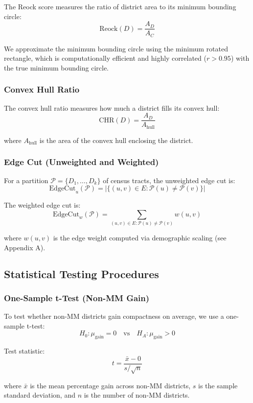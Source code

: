 The Reock score measures the ratio of district area to its minimum bounding circle:
\[
\text{Reock}(D) = \frac{A_D}{A_C}
\]

We approximate the minimum bounding circle using the minimum rotated rectangle, which is computationally efficient and highly correlated ($r > 0.95$) with the true minimum bounding circle.

\subsubsection{Convex Hull Ratio}

The convex hull ratio measures how much a district fills its convex hull:
\[
\text{CHR}(D) = \frac{A_D}{A_{\text{hull}}}
\]

where $A_{\text{hull}}$ is the area of the convex hull enclosing the district.

\subsubsection{Edge Cut (Unweighted and Weighted)}

For a partition $\mathcal{P} = \{D_1, \ldots, D_k\}$ of census tracts, the unweighted edge cut is:
\[
\text{EdgeCut}_u(\mathcal{P}) = |\{(u,v) \in E : \mathcal{P}(u) \neq \mathcal{P}(v)\}|
\]

The weighted edge cut is:
\[
\text{EdgeCut}_w(\mathcal{P}) = \sum_{(u,v) \in E : \mathcal{P}(u) \neq \mathcal{P}(v)} w(u,v)
\]

where $w(u,v)$ is the edge weight computed via demographic scaling (see Appendix A).

\subsection{Statistical Testing Procedures}

\subsubsection{One-Sample t-Test (Non-MM Gain)}

To test whether non-MM districts gain compactness on average, we use a one-sample t-test:
\[
H_0: \mu_{\text{gain}} = 0 \quad \text{vs} \quad H_A: \mu_{\text{gain}} > 0
\]

Test statistic:
\[
t = \frac{\bar{x} - 0}{s / \sqrt{n}}
\]

where $\bar{x}$ is the mean percentage gain across non-MM districts, $s$ is the sample standard deviation, and $n$ is the number of non-MM districts.

